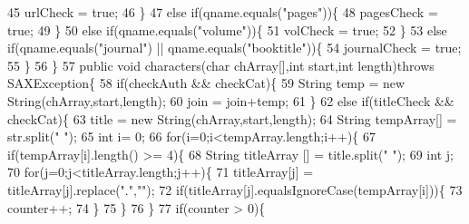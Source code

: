 \begin{DoxyCode}
45                         urlCheck = \textcolor{keyword}{true};
46                     \}
47                     \textcolor{keywordflow}{else} \textcolor{keywordflow}{if}(qname.equals(\textcolor{stringliteral}{"pages"}))\{
48                         pagesCheck = \textcolor{keyword}{true};
49                     \}
50                     \textcolor{keywordflow}{else} \textcolor{keywordflow}{if}(qname.equals(\textcolor{stringliteral}{"volume"}))\{
51                         volCheck = \textcolor{keyword}{true};
52                     \}
53                     \textcolor{keywordflow}{else} \textcolor{keywordflow}{if}(qname.equals(\textcolor{stringliteral}{"journal"}) || qname.equals(\textcolor{stringliteral}{"booktitle"}))\{
54                         journalCheck = \textcolor{keyword}{true};
55                     \}
56                 \}
57                 \textcolor{keyword}{public} \textcolor{keywordtype}{void} characters(\textcolor{keywordtype}{char} chArray[],\textcolor{keywordtype}{int} start,\textcolor{keywordtype}{int} length)\textcolor{keywordflow}{throws} SAXException\{
58                     \textcolor{keywordflow}{if}(checkAuth && checkCat)\{
59                         String temp = \textcolor{keyword}{new} String(chArray,start,length); 
60                         join = join+temp;
61                     \}
62                     \textcolor{keywordflow}{else} \textcolor{keywordflow}{if}(titleCheck && checkCat)\{
63                         title = \textcolor{keyword}{new} String(chArray,start,length);
64                         String tempArray[] = str.split(\textcolor{stringliteral}{" "});
65                         \textcolor{keywordtype}{int} i= 0;
66                         \textcolor{keywordflow}{for}(i=0;i<tempArray.length;i++)\{
67                             \textcolor{keywordflow}{if}(tempArray[i].length() >= 4)\{
68                                 String titleArray [] = title.split(\textcolor{stringliteral}{" "});
69                                 \textcolor{keywordtype}{int} j;
70                                 \textcolor{keywordflow}{for}(j=0;j<titleArray.length;j++)\{
71                                     titleArray[j] = titleArray[j].replace(\textcolor{stringliteral}{"."},\textcolor{stringliteral}{""}); 
72                                     \textcolor{keywordflow}{if}(titleArray[j].equalsIgnoreCase(tempArray[i]))\{
73                                         counter++;
74                                     \}
75                                 \}
76                             \}
77                             \textcolor{keywordflow}{if}(counter > 0)\{

\end{DoxyCode}
